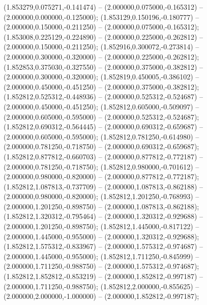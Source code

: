  (1.853279,0.075271,-0.141474) -- (2.000000,0.075000,-0.165312) -- (2.000000,0.000000,-0.125000);
 (1.853129,0.150196,-0.180777) -- (2.000000,0.150000,-0.211250) -- (2.000000,0.075000,-0.165312);
 (1.853008,0.225129,-0.224890) -- (2.000000,0.225000,-0.262812) -- (2.000000,0.150000,-0.211250);
 (1.852916,0.300072,-0.273814) -- (2.000000,0.300000,-0.320000) -- (2.000000,0.225000,-0.262812);
 (1.852853,0.375030,-0.327550) -- (2.000000,0.375000,-0.382812) -- (2.000000,0.300000,-0.320000);
 (1.852819,0.450005,-0.386102) -- (2.000000,0.450000,-0.451250) -- (2.000000,0.375000,-0.382812);
 (1.852812,0.525312,-0.448936) -- (2.000000,0.525312,-0.524687) -- (2.000000,0.450000,-0.451250);
 (1.852812,0.605000,-0.509097) -- (2.000000,0.605000,-0.595000) -- (2.000000,0.525312,-0.524687);
 (1.852812,0.690312,-0.564445) -- (2.000000,0.690312,-0.659687) -- (2.000000,0.605000,-0.595000);
 (1.852812,0.781250,-0.614980) -- (2.000000,0.781250,-0.718750) -- (2.000000,0.690312,-0.659687);
 (1.852812,0.877812,-0.660703) -- (2.000000,0.877812,-0.772187) -- (2.000000,0.781250,-0.718750);
 (1.852812,0.980000,-0.701612) -- (2.000000,0.980000,-0.820000) -- (2.000000,0.877812,-0.772187);
 (1.852812,1.087813,-0.737709) -- (2.000000,1.087813,-0.862188) -- (2.000000,0.980000,-0.820000);
 (1.852812,1.201250,-0.768993) -- (2.000000,1.201250,-0.898750) -- (2.000000,1.087813,-0.862188);
 (1.852812,1.320312,-0.795464) -- (2.000000,1.320312,-0.929688) -- (2.000000,1.201250,-0.898750);
 (1.852812,1.445000,-0.817122) -- (2.000000,1.445000,-0.955000) -- (2.000000,1.320312,-0.929688);
 (1.852812,1.575312,-0.833967) -- (2.000000,1.575312,-0.974687) -- (2.000000,1.445000,-0.955000);
 (1.852812,1.711250,-0.845999) -- (2.000000,1.711250,-0.988750) -- (2.000000,1.575312,-0.974687);
 (1.852812,1.852812,-0.853219) -- (2.000000,1.852812,-0.997187) -- (2.000000,1.711250,-0.988750);
 (1.852812,2.000000,-0.855625) -- (2.000000,2.000000,-1.000000) -- (2.000000,1.852812,-0.997187);
